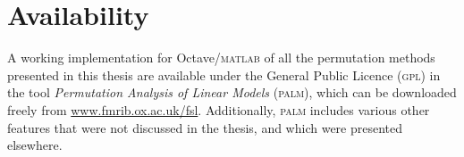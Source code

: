 \section{Availability}
\label{sec:conclusion:palm}

A working implementation for Octave/\textsc{matlab} of all the permutation methods presented in this thesis are available under the General Public Licence (\textsc{gpl}) in the tool \emph{Permutation Analysis of Linear Models} (\textsc{palm}), which can be downloaded freely from \href{http://www.fmrib.ox.ac.uk/fsl}{www.fmrib.ox.ac.uk/fsl}. Additionally, \textsc{palm} includes various other features that were not discussed in the thesis, and which were presented elsewhere.


